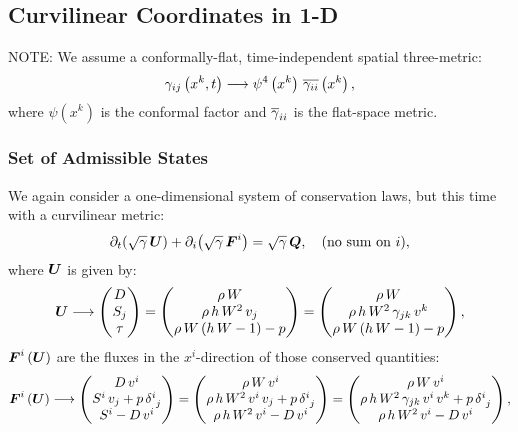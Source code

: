 \newpage


\subsection{Curvilinear Coordinates in 1-D}
NOTE: We assume a conformally-flat, time-independent spatial three-metric:
\begin{equation}
    \gamma_{ij}\left(x^{k},t\right)\longrightarrow\psi^{4}\left(x^{k}\right)\,\ol{\gamma_{ii}}\left(x^{k}\right),
\end{equation}
where $\psi\left(x^{k}\right)$ is the conformal factor and $\ol{\gamma}_{ii}$ is the flat-space metric.

\subsubsection{Set of Admissible States}
We again consider a one-dimensional system of conservation laws, but this time with a curvilinear metric:
\begin{equation}\label{Eq:1DCurvilinearConsLaw}
    \pd{\left(\sqrtgm\,\bU\right)}{t}+\pd{\left(\sqrtgm\,\bF^{i}\right)}{i}=\sqrtgm\,\bQ,\hspace{1em}\text{(no sum on $i$)},
\end{equation}
where $\bU$ is given by:
\begin{equation}
    \bU\longrightarrow\begin{pmatrix} D\\ S_{j}\\ \tau\end{pmatrix}=\begin{pmatrix} \rho\,W\\ \rho\,h\,W^{2}\,v_{j}\\ \rho\,W\left(h\,W-1\right)-p\end{pmatrix}=\begin{pmatrix} \rho\,W\\ \rho\,h\,W^{2}\,\gamma_{jk}\,v^{k}\\ \rho\,W\left(h\,W-1\right)-p\end{pmatrix},
\end{equation}
$\bF^{i}\left(\bU\right)$ are the fluxes in the $x^{i}$-direction of those conserved quantities:
\begin{equation}
    \bF^{i}\left(\bU\right)\longrightarrow\begin{pmatrix}D\,v^{i}\\ S^{i}\,v_{j}+p\,\delta^{i}_{~j}\\ S^{i}-D\,v^{i}\end{pmatrix}=\begin{pmatrix}\rho\,W\,v^{i}\\ \rho\,h\,W^{2}\,v^{i}\,v_{j}+p\,\delta^{i}_{~j}\\\rho\,h\,W^{2}\,v^{i}-D\,v^{i}\end{pmatrix}=\begin{pmatrix}\rho\,W\,v^{i}\\ \rho\,h\,W^{2}\,\gamma_{jk}\,v^{i}\,v^{k}+p\,\delta^{i}_{~j}\\\rho\,h\,W^{2}\,v^{i}-D\,v^{i}\end{pmatrix},
\end{equation}
